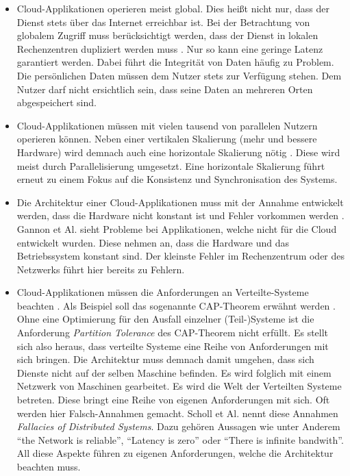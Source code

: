 \begin{itemize}
    \item Cloud-Applikationen operieren meist global. Dies heißt nicht nur, dass der Dienst stets über das Internet erreichbar ist. Bei der Betrachtung von globalem Zugriff muss berücksichtigt werden, dass der Dienst in lokalen Rechenzentren dupliziert werden muss \cite{gannon_cloud-native_2017}. Nur so kann eine geringe Latenz garantiert werden. Dabei führt die Integrität von Daten häufig zu Problem. Die persönlichen Daten müssen dem Nutzer stets zur Verfügung stehen. Dem Nutzer darf nicht ersichtlich sein, dass seine Daten an mehreren Orten abgespeichert sind.  
    \item Cloud-Applikationen müssen mit vielen tausend von parallelen Nutzern operieren können. Neben einer vertikalen Skalierung (mehr und bessere Hardware) wird demnach auch eine horizontale Skalierung nötig \cite{gannon_cloud-native_2017}. Diese wird meist durch Parallelisierung umgesetzt. Eine horizontale Skalierung führt erneut zu einem Fokus auf die Konsistenz und Synchronisation des Systems. 
    \item Die Architektur einer Cloud-Applikationen muss mit der Annahme entwickelt werden, dass die Hardware nicht konstant ist und Fehler vorkommen werden \cite{gannon_cloud-native_2017}. Gannon et Al. \cite{gannon_cloud-native_2017} sieht Probleme bei Applikationen, welche nicht für die Cloud entwickelt wurden. Diese nehmen an, dass die Hardware und das Betriebssystem konstant sind. Der kleinste Fehler im Rechenzentrum oder des Netzwerks führt hier bereits zu Fehlern. 
    \item Cloud-Applikationen müssen die Anforderungen an Verteilte-Systeme beachten \cite{scholl_cloud_2019}. Als Beispiel soll das sogenannte CAP-Theorem erwähnt werden \cite{julianbrowne_brewers_nodate}. Ohne eine Optimierung für den Ausfall einzelner (Teil-)Systeme ist die Anforderung \textit{Partition Tolerance} des CAP-Theorem nicht erfüllt. Es stellt sich also heraus, dass verteilte Systeme eine Reihe von Anforderungen mit sich bringen. Die Architektur muss demnach damit umgehen, dass sich Dienste nicht auf der selben Maschine befinden. Es wird folglich mit einem Netzwerk von Maschinen gearbeitet. Es wird die Welt der Verteilten Systeme betreten. Diese bringt eine Reihe von eigenen Anforderungen mit sich. Oft werden hier Falsch-Annahmen gemacht. Scholl et Al. \cite{scholl_cloud_2019} nennt diese Annahmen  \textit{Fallacies of Distributed Systems}. Dazu gehören Aussagen wie unter Anderem ``the Network is reliable'', ``Latency is zero'' oder ``There is infinite bandwith''. All diese Aspekte führen zu eigenen Anforderungen, welche die Architektur beachten muss.

\end{itemize}
